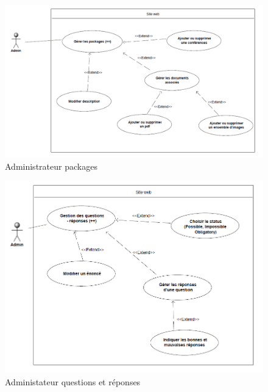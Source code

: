    \begin{figure}[h]
        \begin{center}
            \includegraphics[scale=0.70]{images/uml/adminPackages.png} 
        \end{center}

        \caption{Administrateur packages}
        \label{Administrateur packages}
    \end{figure}

    \begin{figure}[h]
        \begin{center}
            \includegraphics[scale=0.70]{images/uml/adminQuestionsReponses.png} 
        \end{center}

        \caption{Administateur questions et réponses}
        \label{Administateur questions et réponses}
    \end{figure}

